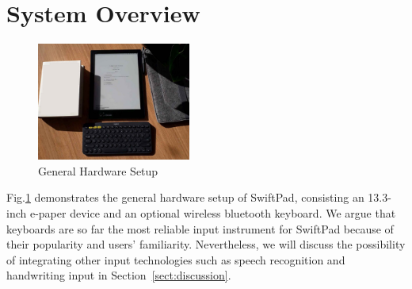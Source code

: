 \documentclass[]{sigchi}
\begin{document}





\section{System Overview} \label{sect:arch}
\begin{figure}
\begin{center}
\includegraphics[width=0.45\textwidth]{figures/keyboard1}
\caption{General Hardware Setup}
\label{fig:setup}
\end{center}
\end{figure}
	

Fig.\ref{fig:setup} demonstrates the general hardware setup of SwiftPad, consisting an 13.3-inch e-paper device and an optional wireless bluetooth keyboard. We argue that keyboards are so far the most reliable input instrument for SwiftPad because of their popularity and users' familiarity. Nevertheless, we will discuss the possibility of integrating other input technologies such as speech recognition and handwriting input in Section~\ref{sect:discussion}. 
\end{document}
